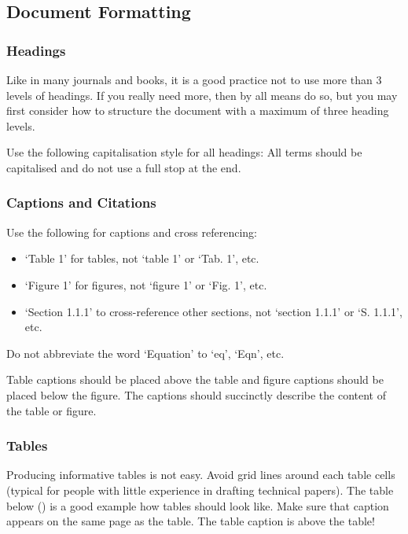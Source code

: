 \subsection{Document Formatting}
\label{sec:document-formatting}

\subsubsection{Headings}
\label{sec:headings}

Like in many journals and books, it is a good practice not to use more than 3 levels of headings. If you really need more, then by all means do so, but you may first consider how to structure the document with a maximum of three heading levels.

Use the following capitalisation style for all headings: All terms should be capitalised and do not use a full stop at the end.

\subsubsection{Captions and Citations}
\label{sec:captions-and-citations}

Use the following for captions and cross referencing:

\begin{itemize}
	\item ‘Table 1’ for tables, not ‘table 1’ or ‘Tab. 1’, etc.
	\item ‘Figure 1’ for figures, not ‘figure 1’ or ‘Fig. 1’, etc.
	\item ‘Section 1.1.1’ to cross-reference other sections, not ‘section 1.1.1’ or ‘S. 1.1.1’, etc.
\end{itemize}

Do not abbreviate the word ‘Equation’ to ‘eq’, ‘Eqn’, etc.

Table captions should be placed above the table and figure captions should be placed below the figure. The captions should succinctly describe the content of the table or figure.

\subsubsection{Tables}
\label{sec:tables}

Producing informative tables is not easy. Avoid grid lines around each table cells (typical for people with little experience in drafting technical papers). The table below () is a good example how tables should look like. Make sure that caption appears on the same page as the table. The table caption is above the table!

